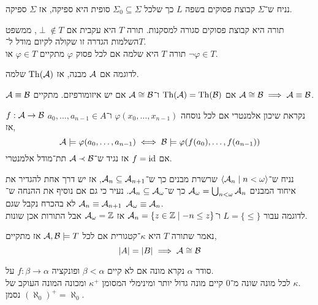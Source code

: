 \begin{theorem}
	נניח ש־$\Sigma$ קבוצת פסוקים בשפה $L$ כך שלכל $\Sigma_0 \subseteq \Sigma$ סופית היא ספיקה, אז $\Sigma$ ספיקה.
\end{theorem}
\begin{definition}[תורה]
	תורה היא קבוצת פסוקים סגורה למסקנות.
	תורה $T$ היא עקבית אם $\perp \notin T$, ממשפט השלמות הגדרה זו שקולה לקיום מודל ל־$T$. \\
	תורה $T$ היא שלמה אם לכל פסוק $\varphi$ מתקיים $\varphi \in T$ או $\lnot \varphi \in T$.
\end{definition}
לדוגמה אם $\mathcal{A}$ מבנה, אז $\operatorname{Th}(\mathcal{A})$ שלמה.
\begin{definition}[שקילות]
	$\mathcal{A} \equiv \mathcal{B}$ אם $\operatorname{Th}(\mathcal{A}) = \operatorname{Th}(\mathcal{B})$ ו־$\mathcal{A} \cong \mathcal{B}$ אם יש איזומורפיזם.
	מתקיים $\mathcal{A} \cong \mathcal{B} \implies \mathcal{A} \equiv \mathcal{B}$.
\end{definition}
\begin{definition}
	$f : \mathcal{A} \to \mathcal{B}$ נקראת שיכון אלמנטרי אם לכל נוסחה $\varphi(x_0, \ldots, x_{n - 1})$ ו־$a_0, \ldots, a_{n - 1} \in A$ אז,
	\[
		\mathcal{A} \models \varphi(a_0, \ldots, a_{n - 1})
		\iff \mathcal{B} \models \varphi(f(a_0), \ldots, f(a_{n - 1}))
	\]
	אם $f = \operatorname{id}$ אז נגיד ש־$\mathcal{A} \prec \mathcal{B}$ תת־מודל אלמנטרי.
\end{definition}
\begin{remark}
	נניח ש־$\langle \mathcal{A}_n \mid n < \omega \rangle$ שרשרת מבנים כך ש־$\mathcal{A}_n \subseteq \mathcal{A}_{n + 1}$,
	אז יש דרך אחת להגדיר את איחוד המבנים $\mathcal{A}_{\omega} = \bigcup_{n < \omega} \mathcal{A}_n$ כך ש־$\mathcal{A}_n \subseteq \mathcal{A}_{\omega}$.
	נעיר כי גם אם נוסיף את ההנחה ש־$\mathcal{A}_n \equiv \mathcal{A}_{n + 1}$ לא בהכרח נקבל שגם $\mathcal{A}_{\omega} \equiv \mathcal{A}_n$. \\
	לדוגמה עבור $L = \{ \le \}$ ו־$\mathcal{A}_n = \{ z \in \mathbb{Z} \mid -n \le z \}$ אז $\mathcal{A}_{\omega} = \mathbb{Z}$ אבל התורות אכן שונות.
\end{remark}
\begin{definition}[קטגוריות]
	נאמר שתורה $T$ היא $\kappa$־קטגורית אם לכל $\mathcal{A}, \mathcal{B} \models T$ אז מתקיים,
	\[
		|A| = |B|
		\implies \mathcal{A} \cong \mathcal{B}
	\]
\end{definition}
\begin{remark}
	סודר $\alpha$ נקרא מונה אם לא קיים $\beta < \alpha$ ופונקציה $f : \beta \to \alpha$ על. \\
	לכל מונה שונה מ־0 קיים מונה גדול יותר ומינימלי המסומן $\kappa^+$ ומכונה המונה העוקב של $\kappa$. \\
	נסמן ${(\aleph_0)}^+ = \aleph_0$.
\end{remark}
